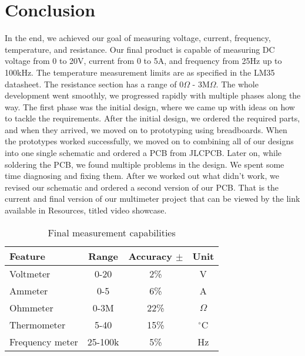 \section{Conclusion}
\label{sec:conclusion}
In the end, we achieved our goal of measuring voltage, current, frequency, temperature, and resistance. Our final product is capable of measuring DC voltage from 0 to 20V, current from 0 to 5A, and frequency from 25Hz up to 100kHz. The temperature measurement limits are as specified in the LM35 datasheet. The resistance section has a range of 0$\Omega$ - 3M$\Omega$. The whole development went smoothly, we progressed rapidly with multiple phases along the way. The first phase was the initial design, where we came up with ideas on how to tackle the requirements. After the initial design, we ordered the required parts, and when they arrived, we moved on to prototyping using breadboards. When the prototypes worked successfully, we moved on to combining all of our designs into one single schematic and ordered a PCB from JLCPCB. Later on, while soldering the PCB, we found multiple problems in the design. We spent some time diagnosing and fixing them. After we worked out what didn't work, we revised our schematic and ordered a second version of our PCB. That is the current and final version of our multimeter project that can be viewed by the link available in Resources, titled video showcase. 
\vspace{2cm}

\begin{table}[h]
    \centering
    \begin{tabular}{|l|c|c|c|}
    \hline
        \textbf{Feature} & \textbf{Range} & \textbf{Accuracy $\pm$} & \textbf{Unit}\\
        \hline
        Voltmeter & 0-20 & 2\% & V\\
        \hline
        Ammeter & 0-5 & 6\% & A\\
        \hline
        Ohmmeter & 0-3M & 22\% & $\Omega$ \\
        \hline
        Thermometer & 5-40 & 15\% & $^{\circ}$C \\
        \hline
        Frequency meter & 25-100k & 5\% & Hz\\
        \hline
    \end{tabular}
    \caption{Final measurement capabilities}
    \label{tab:features}
\end{table}